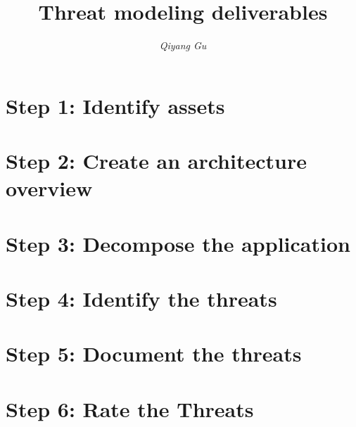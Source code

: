 \documentclass[a4paper, 11pt]{article}
\begin{document}
\title{\textbf{Threat modeling deliverables}}
\author{\textit{Qiyang Gu}}
\date{}
\maketitle


\section*{Step 1: Identify assets}


\section*{Step 2: Create an architecture overview}


\section*{Step 3: Decompose the application}


\section*{Step 4: Identify the threats}


\section*{Step 5: Document the threats}


\section*{Step 6: Rate the Threats}
\end{document}
